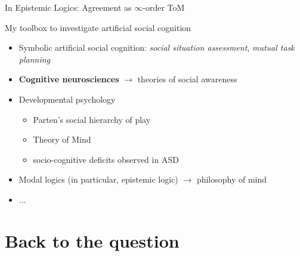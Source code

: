 \documentclass[compress]{beamer}
\begin{document}
{
\begin{frame}{In Epistemic Logics: Agreement as $\infty$-order ToM}
\end{frame}
}


\begin{frame}{My toolbox to investigate artificial social cognition}
    \begin{itemize}
        \item Symbolic artificial social cognition: \emph{social situation
            assessment}, \emph{mutual task planning}
        \item {\bf Cognitive neurosciences} $\rightarrow$ theories of social
            awareness
        \item Developmental psychology
            \begin{itemize}
                \item Parten's social hierarchy of play
                \item Theory of Mind
                \item socio-cognitive deficits observed in ASD
            \end{itemize}
        \item Modal logics (in particular, epistemic logic) $\rightarrow$
            philosophy of mind
        \item ...
    \end{itemize}
\end{frame}



\section{Back to the question}
\end{document}

